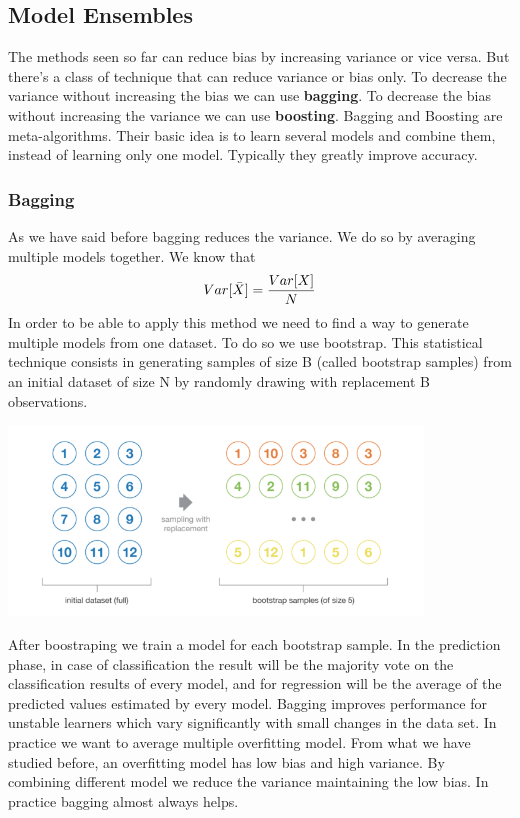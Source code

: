\documentclass[main.tex]{subfiles}
\begin{document}
\subsection{Model Ensembles}
The methods seen so far can reduce bias by increasing variance or vice versa. But there's a class of technique that can reduce variance or bias only.
To decrease the variance without increasing the bias we can use \textbf{bagging}.
To decrease the bias without increasing the variance we can use \textbf{boosting}.
Bagging and Boosting are meta-algorithms. Their basic idea is to learn several models and combine them, instead of learning only one model. Typically they greatly improve accuracy.

\subsubsection{Bagging}
As we have said before bagging reduces the variance. We do so by averaging multiple models together. We know that
\begin{equation}
    Var[\Bar{X}] = \frac{Var[X]}{N}
\end{equation}
In order to be able to apply this method we need to find a way to generate multiple models from one dataset. To do so we use bootstrap.
This statistical technique consists in generating samples of size B (called bootstrap samples) from an initial dataset of size N by randomly drawing with replacement B observations.
\begin{center}
    \includegraphics[width=110mm]{img/bootstrap.png}
\end{center}
After boostraping we train a model for each bootstrap sample. In the prediction phase, in case of classification the result will be the majority vote on the classification results of every model, and for regression will be the average of the predicted values estimated by every model. Bagging improves performance for unstable learners which vary significantly with small changes in the data set. In practice we want to average multiple overfitting model. From what we have studied before, an overfitting model has low bias and high variance. By combining different model we reduce the variance maintaining the low bias. In practice bagging almost always helps.
\end{document}
